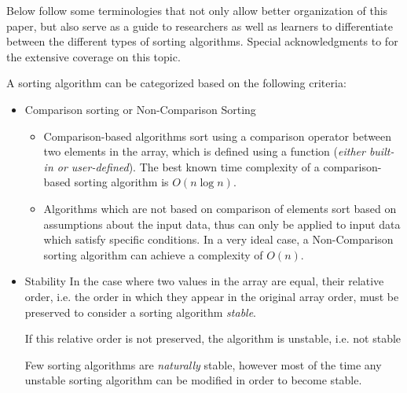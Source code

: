 \documentclass[a4paper]{article}
\begin{document}
            Below follow some terminologies that not only allow better organization of this paper, but also serve as a guide to researchers as well as learners to differentiate between the different types of sorting algorithms. Special acknowledgments to \cite{ali2021sorting} for the extensive coverage on this topic.

            A sorting algorithm can be categorized based on the following criteria:
            \begin{itemize}
                \item Comparison sorting or Non-Comparison Sorting
                    \begin{itemize}
                        \item Comparison-based algorithms sort using a comparison operator between two elements in the array, which is defined using a function (\emph{either built-in or user-defined}). The best known time complexity of a comparison-based sorting algorithm is \(O(n \log n)\).
                        \item Algorithms which are not based on comparison of elements sort based on assumptions about the input data, thus can only be applied to input data which satisfy specific conditions. In a very ideal case, a Non-Comparison sorting algorithm can achieve a complexity of \(O(n)\).
                    \end{itemize} 
                    
                    
                \item Stability
                    In the case where two values in the array are equal, their relative order, i.e. the order in which they appear in the original array order, must be preserved to consider a sorting algorithm \emph{stable}.

                    If this relative order is not preserved, the algorithm is unstable, i.e. not stable

                    Few sorting algorithms are \emph{naturally} stable, however most of the time any unstable sorting algorithm can be modified in order to become stable\supercite{the_skiena_2010}.


\end{itemize}
\end{document}
